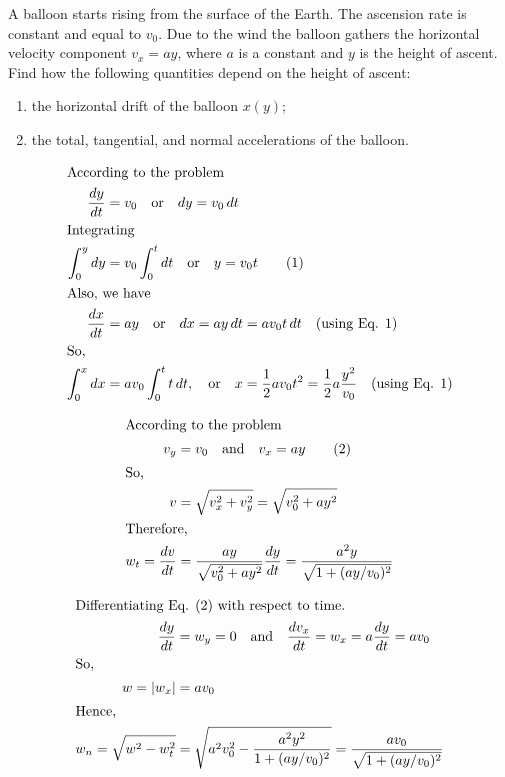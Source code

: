 
\item A balloon starts rising from the surface of the Earth. The ascension rate is constant and equal to \( v_0 \). Due to the wind the balloon gathers the horizontal velocity component \( v_x = ay \), where \( a \) is a constant and \( y \) is the height of ascent. Find how the following quantities depend on the height of ascent:
    \begin{enumerate}
        \item the horizontal drift of the balloon \( x(y) \);
        \item the total, tangential, and normal accelerations of the balloon.
    \end{enumerate}

\begin{solution}
    \begin{align*}
        \intertext{According to the problem}
        \dfrac{dy}{dt} &= v_0 \quad \text{or} \quad dy = v_0 \, dt \\
        \intertext{Integrating}
        \int_0^y dy &= v_0 \int_0^t dt \quad \text{or} \quad y = v_0 t \tag{1} \\
        \intertext{Also, we have}
        \dfrac{dx}{dt} &= ay \quad \text{or} \quad dx = ay \, dt = av_0 t \, dt \quad \text{(using Eq. 1)} \\
        \intertext{So,}
        \int_0^x dx &= av_0 \int_0^t t \, dt, \quad \text{or} \quad x = \dfrac{1}{2} av_0 t^2 = \dfrac{1}{2} a \dfrac{y^2}{v_0} \quad \text{(using Eq. 1)}
    \end{align*}
    
    \begin{align*}
        \intertext{According to the problem}
        v_y &= v_0 \quad \text{and} \quad v_x = ay \tag{2} \\
        \intertext{So,}
        v &= \sqrt{v_x^2 + v_y^2} = \sqrt{v_0^2 + ay^2} \\
        \intertext{Therefore,}
        w_t = \dfrac{dv}{dt} &= \dfrac{ay}{\sqrt{v_0^2 + ay^2}} \dfrac{dy}{dt} = \dfrac{a^2 y}{\sqrt{1 + (ay/v_0)^2}}
    \end{align*}
    
    \begin{align*}
        \intertext{Differentiating Eq. (2) with respect to time.}
        \dfrac{dy}{dt} &= w_y = 0 \quad \text{and} \quad \dfrac{dv_x}{dt} = w_x = a \dfrac{dy}{dt} = av_0 \\
        \intertext{So,}
        w = \left|w_x \right| &= av_0 \\
        \intertext{Hence,}
        w_n = \sqrt{w^2 - w_t^2} &= \sqrt{a^2 v_0^2 - \dfrac{a^2 y^2}{1 + (ay/v_0)^2}} = \dfrac{av_0}{\sqrt{1 + (ay/v_0)^2}}
    \end{align*}
\end{solution}
